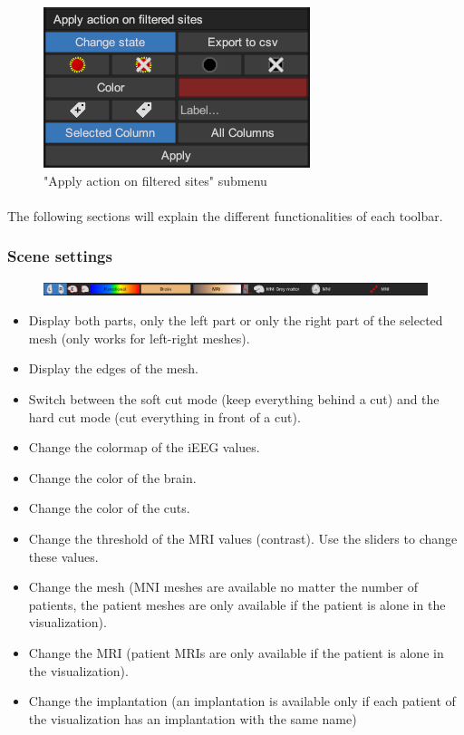 \documentclass[a4paper]{article}
\begin{document}
\begin{figure}[H]
\begin{center}
\includegraphics[scale=0.5]{SitesAction.png}
\end{center}
\caption{\label{sitesAction}"Apply action on filtered sites" submenu}
\end{figure}
\paragraph{} The following sections will explain the different functionalities of each toolbar.
\subsubsection{Scene settings}
\begin{figure}[H]
\begin{center}
\includegraphics[scale=0.5]{SceneSettings.png}
\end{center}
\end{figure}
\begin{itemize}
\item Display both parts, only the left part or only the right part of the selected mesh (only works for left-right meshes).
\item Display the edges of the mesh.
\item Switch between the soft cut mode (keep everything behind a cut) and the hard cut mode (cut everything in front of a cut).
\item Change the colormap of the iEEG values.
\item Change the color of the brain.
\item Change the color of the cuts.
\item Change the threshold of the MRI values (contrast). Use the sliders to change these values.
\item Change the mesh (MNI meshes are available no matter the number of patients, the patient meshes are only available if the patient is alone in the visualization).
\item Change the MRI (patient MRIs are only available if the patient is alone in the visualization).
\item Change the implantation (an implantation is available only if each patient of the visualization has an implantation with the same name)
\end{itemize}
\end{document}
